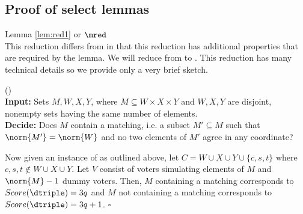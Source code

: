 \subsection{Proof of select lemmas} \label{subsec:pflem}


\begin{pfsketch}{Lemma \ref{lem:red1} or
                     $\mred$ }\\
    This reduction differs from \citet{bartholdiVoting}
    in that this reduction has additional properties that are required
    by the lemma.
    We will reduce from  to \dscore.
    This reduction has many technical details so we provide only a
    very brief sketch.

\begin{problem}{ ()}\\
    \tab \textbf{Input:} Sets $M,W,X,Y$, where $M\subseteq W \times
    X \times Y$ and $W,X,Y$ are disjoint, nonempty sets having the
    same number of elements.\\
    \tab \textbf{Decide:} Does $M$ contain a matching, i.e. a subset
    $M' \subseteq M$ such that $\norm{M'} = \norm{W}$
    and no two elements of $M'$ agree in any coordinate?
\end{problem}

    Now given an instance of  as outlined above,
    let $C = W \cup X \cup Y \cup \{c,s,t\}$ where $c,s,t \notin W \cup X \cup Y$.
    Let $V$ consist of voters simulating elements of $M$ and $\norm{M}-1$ dummy
    voters.
    Then, $M$ containing a matching corresponds to $Score(\dtriple) = 3q$ and
    $M$ not containing a matching corresponds to $Score(\dtriple) = 3q+1$.
    $\square$
\end{pfsketch}

